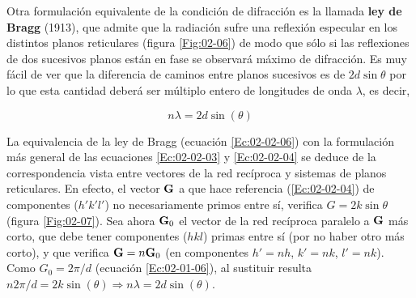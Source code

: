 Otra formulación equivalente de la condición de difracción es la llamada \textbf{ley de Bragg} (1913), que admite que la radiación sufre una reflexión especular en los distintos planos reticulares (figura \ref{Fig:02-06}) de modo que sólo si las reflexiones de dos sucesivos planos están en fase se observará máximo de difracción. Es muy fácil de ver que la diferencia de caminos entre planos sucesivos es de $2d\sin \theta$ por lo que esta cantidad deberá ser múltiplo entero de longitudes de onda $\lambda$, es decir,
\begin{mybox}
\begin{equation}
    n \lambda = 2 d \sin (\theta) \label{Ec:02-02-06}
\end{equation}
\end{mybox}
La equivalencia de la ley de Bragg (ecuación \ref{Ec:02-02-06}) con la formulación más general de las ecuaciones \ref{Ec:02-02-03} y \ref{Ec:02-02-04} se deduce de la correspondencia vista entre vectores de la red recíproca y sistemas de planos reticulares. En efecto, el vector $\mathbf{G}$ a que hace referencia (\ref{Ec:02-02-04}) de componentes ($h' k' l'$) no necesariamente primos entre sí, verifica $G=2k\sin \theta$ (figura \ref{Fig:02-07}). Sea ahora $\mathbf{G}_0$ el vector de la red recíproca paralelo a $\mathbf{G}$ más corto, que debe tener componentes ($hkl$) primas entre sí (por no haber otro más corto), y que verifica $\mathbf{G} = n \mathbf{G}_0$ (en componentes $h'=nh$, $k'=nk$, $l'=nk$). Como $G_0 = 2\pi/d$ (ecuación \ref{Ec:02-01-06}), al sustituir resulta $n2\pi/d=2k\sin (\theta) \Rightarrow n \lambda = 2 d \sin (\theta)$. 
